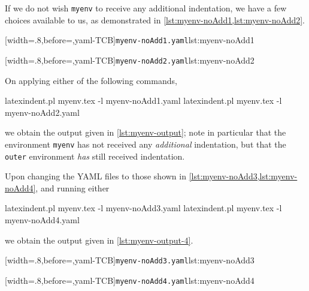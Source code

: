 \documentclass[10pt]{article}
\begin{document}

If we do not wish \texttt{myenv} to receive any additional indentation, we have a few choices available to us, 
as demonstrated in \cref{lst:myenv-noAdd1,lst:myenv-noAdd2}.

\begin{minipage}{.45\textwidth}
[width=.8\linewidth,before=\centering,yaml-TCB]{\texttt{myenv-noAdd1.yaml}}{lst:myenv-noAdd1}
\end{minipage}
\hfill
\begin{minipage}{.45\textwidth}
[width=.8\linewidth,before=\centering,yaml-TCB]{\texttt{myenv-noAdd2.yaml}}{lst:myenv-noAdd2}
\end{minipage}

On applying either of the following commands,
\begin{commandshell}
latexindent.pl myenv.tex -l myenv-noAdd1.yaml  
latexindent.pl myenv.tex -l myenv-noAdd2.yaml  
\end{commandshell}
we obtain the output given in \cref{lst:myenv-output}; note in particular that the environment \texttt{myenv} 
has not received any \emph{additional} indentation, but that the \texttt{outer} environment \emph{has} still 
received indentation.


Upon changing the YAML files to those shown in \cref{lst:myenv-noAdd3,lst:myenv-noAdd4}, and running either
\begin{commandshell}
latexindent.pl myenv.tex -l myenv-noAdd3.yaml  
latexindent.pl myenv.tex -l myenv-noAdd4.yaml  
\end{commandshell}
we obtain the output given in \cref{lst:myenv-output-4}. 

\begin{minipage}{.45\textwidth}
[width=.8\linewidth,before=\centering,yaml-TCB]{\texttt{myenv-noAdd3.yaml}}{lst:myenv-noAdd3}
\end{minipage}
\hfill
\begin{minipage}{.45\textwidth}
[width=.8\linewidth,before=\centering,yaml-TCB]{\texttt{myenv-noAdd4.yaml}}{lst:myenv-noAdd4}
\end{minipage}
\end{document}
